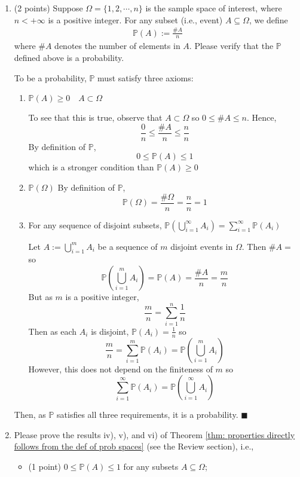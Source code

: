 \documentclass[11pt,letterpaper, leqno]{article}
\numberwithin{equation}{section}
\numberwithin{theorem}{section}
\numberwithin{lemma}{section}
\numberwithin{corollary}{section}
\numberwithin{definition}{section}
\numberwithin{proposition}{section}
\numberwithin{remark}{section}
\numberwithin{example}{section}
\renewcommand{\P}{\mathbb{P}}
\begin{document}
\begin{enumerate}
    \item (2 points) Suppose $\Omega=\{1,2,\cdots,n\}$ is the sample space of interest, where $n<+\infty$ is a positive integer. For any subset (i.e., event) $A\subseteq \Omega$, we define 
    \begin{align*}
        \mathbb{P}(A):=\frac{\# A}{n}
    \end{align*}
    where $\# A$ denotes the number of elements in $A$. Please verify that the $\mathbb{P}$ defined above is a probability. 

    \color{blue}
    To be a probability, $\P$ must satisfy three axioms:
    \begin{enumerate}
        \item $\P(A) \geq 0 \quad A \subset \Omega$ 
        
        To see that this is true, observe that $A \subset \Omega$ so $0 \leq \# A \leq n$. Hence, 
        \[\frac{0}{n} \leq \frac{\# A}{n} \leq \frac{n}{n}\]
        By definition of $\P$, 
        \[0 \leq \P(A) \leq 1\]
        which is a stronger condition than $\P(A) \geq 0$

        \item $\P(\Omega)$
        By definition of $\P$, 
        \[\P(\Omega) = \frac{\# \Omega}{n} = \frac{n}{n} = 1\]

        \item For any sequence of disjoint subsets, $\P(\bigcup_{i=1}^\infty A_i) = \sum_{i=1}^\infty \P(A_i)$
        
        Let $A := \bigcup_{i=1}^m A_i$ be a sequence of $m$ disjoint events in $\Omega$. Then $\#A =$ so 
        \[\P\left(\bigcup_{i=1}^m A_i\right) = \P(A) = \frac{\# A}{n} = \frac{m}{n}\]
        But as $m$ is a positive integer, 
        \[\frac{m}{n} = \sum_{i=1}^n \frac{1}{n}\]
        Then as each $A_i$ is disjoint, $\P(A_i) = \frac{1}{n}$ so 
        \[\frac{m}{n} = \sum_{i=1}^m \P(A_i) = \P\left(\bigcup_{i=1}^m A_i\right)\]
        However, this does not depend on the finiteness of $m$ so 
        \[\sum_{i=1}^\infty \P(A_i) = \P\left(\bigcup_{i=1}^\infty A_i\right)\]
    \end{enumerate}
    Then, as $\P$ satisfies all three requirements, it is a probability. $\blacksquare$
    \color{black}
    \pagebreak 

    \item Please prove the results iv), v), and vi) of Theorem \ref{thm: properties directly follows from the def of prob spaces} (see the Review section), i.e.,
    \begin{itemize}
        \item (1 point) $0\le \mathbb{P}(A) \le 1$ for any subsets $A \subseteq \Omega$; 
        

\end{itemize}
\end{enumerate}
\end{document}
